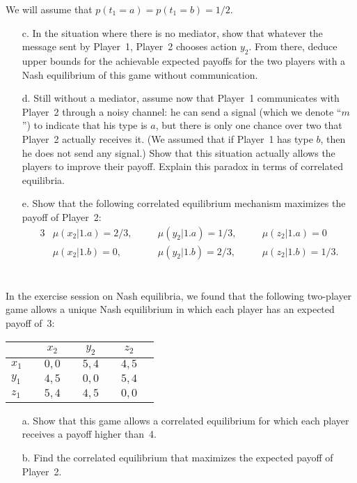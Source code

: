 \documentclass{../ape}
\begin{document}
We will assume that $p(t_1 = a) = p(t_1 = b) = 1/2$.
	
\begin{enumerate}
	\item[c.] In the situation where there is no mediator, show that whatever the message sent by Player~1, Player~2 chooses action $y_2$. From there, deduce upper bounds for the achievable expected payoffs for the two players with a Nash equilibrium of this game without communication.
	\item[d.] Still without a mediator, assume now that Player~1 communicates with Player~2 through a noisy channel: he can send a signal (which we denote ``$m$'') to indicate that his type is $a$, but there is only one chance over two that Player~2 actually receives it. (We assumed that if Player~1 has type $b$, then he does not send any signal.) Show that this situation actually allows the players to improve their payoff. Explain this paradox in terms of correlated equilibria. 
	\item[e.] Show that the following correlated equilibrium mechanism maximizes the payoff of Player~2:
		\begin{alignat*}{3}
			& \mu(x_2 | 1.a) = 2/3, \quad && \mu(y_2 | 1.a) = 1/3, \quad && \mu(z_2 | 1.a) = 0 \\
			& \mu(x_2 | 1.b) = 0,   \quad && \mu(y_2 | 1.b) = 2/3, \quad && \mu(z_2 | 1.b) = 1/3.
		\end{alignat*}
\end{enumerate}

\section{}
In the exercise session on Nash equilibria, we found that the following two-player game allows a unique Nash equilibrium in which each player has an expected payoff of~3:

	\begin{center}
		\begin{tabular}[h!]{l|ccccccc}
			&& $x_2$ && $y_2$ && $z_2$ & \\
			\hline
			$x_1$ && $0,0$ && $5,4$ && $4,5$ & \\
			$y_1$ && $4,5$ && $0,0$ && $5,4$ & \\
			$z_1$ && $5,4$ && $4,5$ && $0,0$ & 
		\end{tabular} 
	\end{center}
	
\begin{enumerate}
	\item[a.] Show that this game allows a correlated equilibrium for which each player receives a payoff higher than~4.
	\item[b.] Find the correlated equilibrium that maximizes the expected payoff of Player~2.
\end{enumerate}
\end{document}

